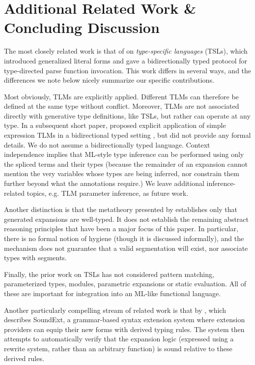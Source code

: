 \documentclass[acmsmall,10pt,review,anonymous]{acmart}\settopmatter{printfolios=true}
\begin{document}

\newcommand{\discussionSec}{Additional Related Work \& Concluding Discussion}
\section{\protect\discussionSec}
\label{sec:related-work}
\label{sec:discussion}
\label{sec:conclusion}
\vspace{-3px}
The most closely related work is that of \citet{TSLs} on \emph{type-specific languages} (TSLs), which introduced generalized literal forms and gave a bidirectionally typed protocol for type-directed parse function invocation. This work differs in several ways, and the differences we note below nicely summarize our specific contributions. 

Most obviously, TLMs are explicitly applied. Different TLMs can therefore be defined at the same type without conflict. Moreover, TLMs are not associated directly with generative type definitions, like TSLs,  but rather can operate at any type. In a subsequent short paper, \citet{sac15} proposed explicit application of simple expression TLMs in a bidirectional typed setting \cite{Pierce:2000:LTI:345099.345100}, but did not provide any formal details. We do not assume a bidirectionally typed language. Context independence implies that ML-style type inference can be performed using only the spliced terms and their types (because the remainder of an expansion cannot mention the very variables whose types are being inferred, nor constrain them further beyond what the annotations require.) We leave additional inference-related topics, e.g. TLM parameter inference, as future work.

Another distinction is that the metatheory presented by \citet{TSLs} establishes only that generated expansions are well-typed. It does not establish the remaining abstract reasoning principles that have been a major focus of this paper. In particular, there is no formal notion of hygiene (though it is discussed informally), and the mechanism does not guarantee that a valid segmentation will exist, nor associate types with segments.

Finally, the prior work on TSLs has not considered pattern matching, parameterized types, modules, parametric expansions or static evaluation. All of these are important for integration into an ML-like functional language.

Another particularly compelling stream of related work is that by \citet{conf/icfp/LorenzenE13,conf/popl/LorenzenE16}, which describes SoundExt, a grammar-based syntax extension system where extension providers can equip their new forms with derived typing rules. The system then attempts to automatically verify that the expansion logic (expressed using a rewrite system, rather than an arbitrary function) is sound relative to these derived rules. 
\end{document}

